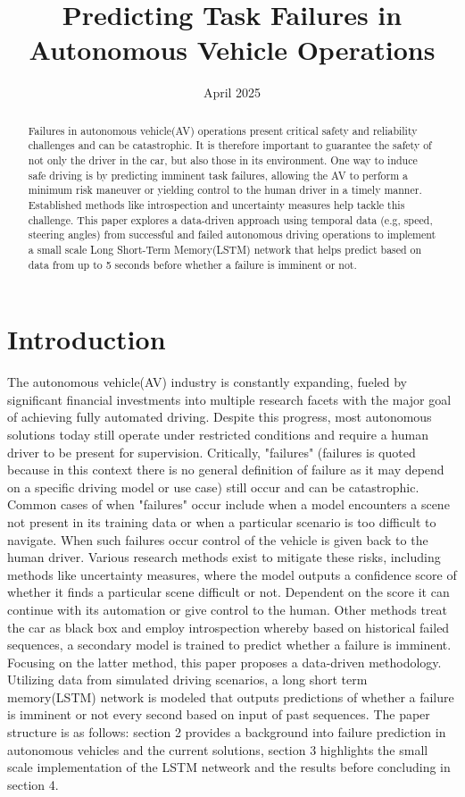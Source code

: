 \documentclass[conference]{IEEEtran}
\title{Predicting Task Failures in Autonomous Vehicle Operations}
\author{
    \IEEEauthorblockN{Mofifoluwa Ipadeola Akinwande}
    \IEEEauthorblockA{
         \textit{Electronic Engineering} \\
        \textit{Hochschule Hamm-Lippstadt}\\
        Lippstadt, Germany \\
        mofifoluwa-ipadeola.akinwande@stud.hshl.de
    }
}
\date{April 2025}
\begin{document}
\maketitle
\begin{abstract}
   Failures in autonomous vehicle(AV) operations present critical safety and reliability challenges and can be catastrophic. It is therefore important to guarantee the safety of not only the driver in the car, but also those in its environment. One way to induce safe driving is by predicting imminent task failures, allowing the AV to perform a minimum risk maneuver or yielding control to the human driver in a timely manner. Established methods like introspection and uncertainty measures help tackle this challenge. This paper explores a data-driven approach using temporal data (e.g, speed, steering angles) from successful and failed autonomous driving operations to implement a small scale Long Short-Term Memory(LSTM) network that helps predict based on data from up to 5 seconds before whether a failure is imminent or not.
\end{abstract}
\section{Introduction}
The autonomous vehicle(AV) industry is constantly expanding, fueled by significant financial investments into multiple research facets with the major goal of achieving fully automated driving. Despite this progress, most autonomous solutions today still operate under restricted conditions and require a human driver to be present for supervision.  Critically, "failures" (failures is quoted because in this context there is no general definition of failure as it may depend on a specific driving model or use case) still occur and can be catastrophic. Common cases of when "failures" occur include when a model encounters a scene not present in its training data or when a particular scenario is too difficult to navigate. When such failures occur control of the vehicle is given back to the human driver. 
Various research methods exist to mitigate these risks, including methods like uncertainty measures, where the model outputs a confidence score of whether it finds a particular scene difficult or not\cite{hecker2018}. Dependent on the score it can continue with its automation or give control to the human. Other methods \cite{kuhn2020} treat the car as black box and employ introspection whereby based on historical failed sequences, a secondary model is trained to predict whether a failure is imminent.
Focusing on the latter method, this paper proposes a data-driven methodology. Utilizing data from simulated driving scenarios, a long short term memory(LSTM) network is modeled that outputs predictions of whether a failure is imminent or not every second based on input of past sequences. The paper structure is as follows: section 2 provides a background into failure prediction in autonomous vehicles and the current solutions, section 3 highlights the small scale implementation of the LSTM netweork and the results before concluding in section 4.
\end{document}
